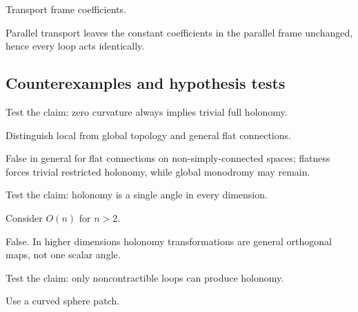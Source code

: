 \begin{hint}
Transport frame coefficients.
\end{hint}

\begin{solution}
Parallel transport leaves the constant coefficients in the parallel frame unchanged, hence every loop acts identically.
\end{solution}

\subsection*{Counterexamples and hypothesis tests}

\begin{exercise}\label{exr:vii25-ped-10}
Test the claim: zero curvature always implies trivial full holonomy.
\end{exercise}

\begin{hint}
Distinguish local from global topology and general flat connections.
\end{hint}

\begin{solution}
False in general for flat connections on non-simply-connected spaces; flatness forces trivial restricted holonomy, while global monodromy may remain.
\end{solution}

\begin{exercise}\label{exr:vii25-ped-11}
Test the claim: holonomy is a single angle in every dimension.
\end{exercise}

\begin{hint}
Consider \(O(n)\) for \(n>2\).
\end{hint}

\begin{solution}
False.  In higher dimensions holonomy transformations are general orthogonal maps, not one scalar angle.
\end{solution}

\begin{exercise}\label{exr:vii25-ped-12}
Test the claim: only noncontractible loops can produce holonomy.
\end{exercise}

\begin{hint}
Use a curved sphere patch.
\end{hint}


